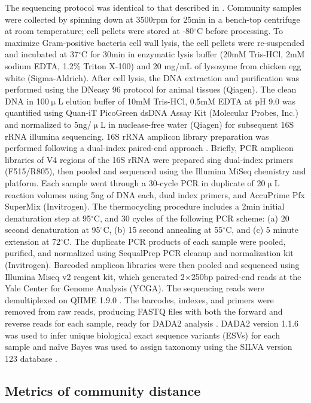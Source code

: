 \documentclass[a4paper,10pt]{article}
\begin{document}
The sequencing protocol was identical to that described in \cite{Goldford2018}.
Community samples were collected by spinning down at 3500rpm for 25min
in a bench-top centrifuge at room temperature;
cell pellets were stored at -80$^\circ$C before processing.
To maximize Gram-positive bacteria cell wall lysis,
the cell pellets were re-suspended and incubated at 37$^\circ$C for 30min
in enzymatic lysis buffer (20mM Tris-HCl, 2mM sodium EDTA, 1.2\% Triton X-100)
and 20 mg/mL of lysozyme from chicken egg white (Sigma-Aldrich).
After cell lysis, the DNA extraction and purification was performed using the
DNeasy 96 protocol for animal tissues (Qiagen).
The clean DNA in 100$\upmu$L elution buffer of 10mM Tris-HCl, 0.5mM EDTA
at pH 9.0 was quantified using Quan-iT PicoGreen dsDNA Assay Kit
(Molecular Probes, Inc.)
and normalized to 5ng/$\upmu$L in nuclease-free water (Qiagen)
for subsequent 16S rRNA illumina sequencing.
16S rRNA amplicon library preparation was performed following a dual-index
paired-end approach \cite{Kozich2013}.
Briefly, PCR amplicon libraries of V4 regions of the 16S rRNA were prepared 
sing dual-index primers (F515/R805), then pooled and sequenced
using the Illumina MiSeq chemistry and platform.
Each sample went through a 30-cycle PCR in duplicate of 20$\upmu$L
reaction volumes using 5ng of DNA each, dual index primers, and AccuPrime Pfx SuperMix (Invitrogen).
The thermocycling procedure includes a 2min initial denaturation step at
95$^\circ$C, and 30 cycles of the following PCR scheme:
(a) 20 second denaturation at 95$^\circ$C,
(b) 15 second annealing at 55$^\circ$C,
and (c) 5 minute extension at 72$^\circ$C.
The duplicate PCR products of each sample were pooled, purified, and normalized
using SequalPrep PCR cleanup and normalization kit (Invitrogen).
Barcoded amplicon libraries were then pooled and sequenced using
Illumina Miseq v2 reagent kit, which generated 2$\times$250bp paired-end reads
at the Yale Center for Genome Analysis (YCGA).
The sequencing reads were demultiplexed on QIIME 1.9.0 \cite{Caporaso2010}.
The barcodes, indexes, and primers were removed from raw reads,
producing FASTQ files with both the forward and reverse reads for each sample,
ready for DADA2 analysis \cite{Callahan2017}.
DADA2 version 1.1.6 was used to infer unique biological exact sequence variants
(ESVs) for each sample
and na{\"i}ve Bayes was used to assign taxonomy using the SILVA version 123
database \cite{Wang2007,Quast2013}.

\subsection*{Metrics of community distance}
\label{methods:metrics}
\end{document}

